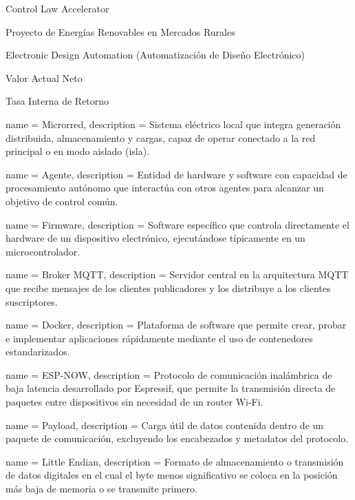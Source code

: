{Control Law Accelerator}

{Proyecto de Energías Renovables en Mercados Rurales}

{Electronic Design Automation (Automatización de Diseño Electrónico)}

{Valor Actual Neto}

{Tasa Interna de Retorno}


{
    name = Microrred,
    description = {Sistema eléctrico local que integra generación distribuida, almacenamiento y cargas, capaz de operar conectado a la red principal o en modo aislado (isla).}
}

{
    name = Agente,
    description = {Entidad de hardware y software con capacidad de procesamiento autónomo que interactúa con otros agentes para alcanzar un objetivo de control común.}
}

{
    name = Firmware,
    description = {Software específico que controla directamente el hardware de un dispositivo electrónico, ejecutándose típicamente en un microcontrolador.}
}

{
    name = Broker MQTT,
    description = {Servidor central en la arquitectura MQTT que recibe mensajes de los clientes publicadores y los distribuye a los clientes suscriptores.}
}

{
    name = Docker,
    description = {Plataforma de software que permite crear, probar e implementar aplicaciones rápidamente mediante el uso de contenedores estandarizados.}
}

{
    name = ESP-NOW,
    description = {Protocolo de comunicación inalámbrica de baja latencia desarrollado por Espressif, que permite la transmisión directa de paquetes entre dispositivos sin necesidad de un router Wi-Fi.}
}

{
    name = Payload,
    description = {Carga útil de datos contenida dentro de un paquete de comunicación, excluyendo los encabezados y metadatos del protocolo.}
}

{
    name = Little Endian,
    description = {Formato de almacenamiento o transmisión de datos digitales en el cual el byte menos significativo se coloca en la posición más baja de memoria o se transmite primero.}
}

